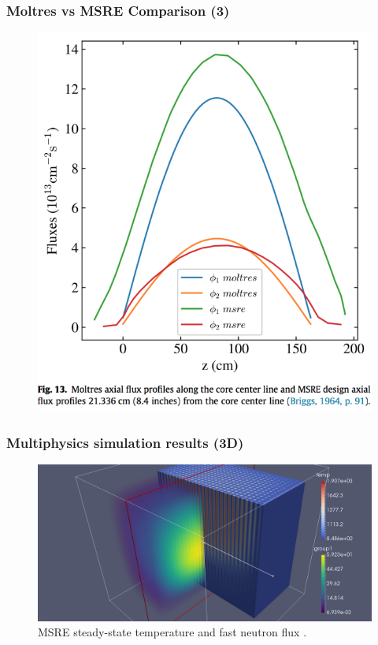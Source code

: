 \begin{frame}
  \frametitle{Moltres vs MSRE Comparison (3)}
  \begin{figure}[t]
   \includegraphics[height=0.85\textheight]{./images/msre_axial_flux.png}
    \end{figure}

\end{frame}

\begin{frame}
  \frametitle{Multiphysics simulation results (3D)}
  \begin{figure}[t]
   \vspace{-0.15in}
   \hspace*{-0.8in}
   \includegraphics[height=0.8\textheight]{./images/moltres_3D.png}
   \caption{\gls{MSRE} steady-state temperature and fast neutron flux \cite{ridley_introduction_2017}.}
    \end{figure}
\end{frame}

